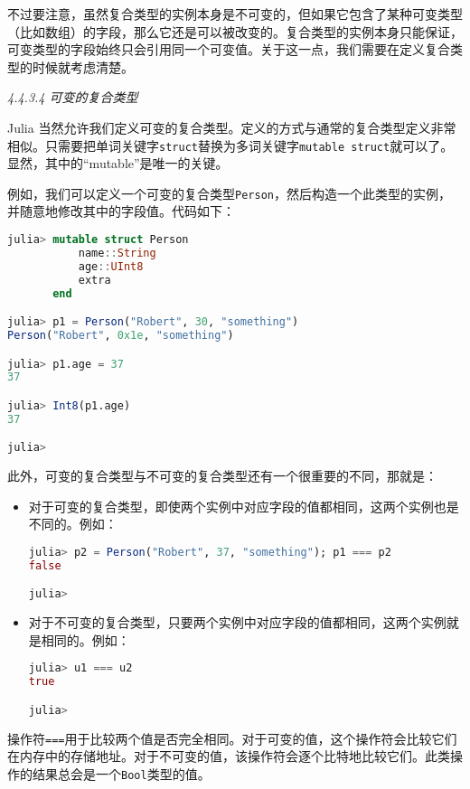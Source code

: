 不过要注意，虽然复合类型的实例本身是不可变的，但如果它包含了某种可变类型（比如数组）的字段，那么它还是可以被改变的。复合类型的实例本身只能保证，可变类型的字段始终只会引用同一个可变值。关于这一点，我们需要在定义复合类型的时候就考虑清楚。

\textsl{4.4.3.4 可变的复合类型}

Julia 当然允许我们定义可变的复合类型。定义的方式与通常的复合类型定义非常相似。只需要把单词关键字\verb|struct|替换为多词关键字\verb|mutable struct|就可以了。显然，其中的“mutable”是唯一的关键。

例如，我们可以定义一个可变的复合类型\verb|Person|，然后构造一个此类型的实例，并随意地修改其中的字段值。代码如下：

\begin{lstlisting}[language=julia]
julia> mutable struct Person
           name::String
           age::UInt8
           extra
       end

julia> p1 = Person("Robert", 30, "something")
Person("Robert", 0x1e, "something")

julia> p1.age = 37
37

julia> Int8(p1.age)
37

julia> 
\end{lstlisting}

此外，可变的复合类型与不可变的复合类型还有一个很重要的不同，那就是：

\begin{itemize}
\item 对于可变的复合类型，即使两个实例中对应字段的值都相同，这两个实例也是不同的。例如：

\begin{lstlisting}[language=julia]
julia> p2 = Person("Robert", 37, "something"); p1 === p2
false

julia> 
\end{lstlisting}

\item 对于不可变的复合类型，只要两个实例中对应字段的值都相同，这两个实例就是相同的。例如：

\begin{lstlisting}[language=julia]
julia> u1 === u2
true

julia> 
\end{lstlisting}

\end{itemize}
操作符\verb|===|用于比较两个值是否完全相同。对于可变的值，这个操作符会比较它们在内存中的存储地址。对于不可变的值，该操作符会逐个比特地比较它们。此类操作的结果总会是一个\verb|Bool|类型的值。

